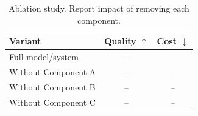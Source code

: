 \begin{table}[t]
  \centering
  \caption{Ablation study. Report impact of removing each component.}
  \label{tab:ablation}
  \begin{tabular}{lcc}
    \toprule
    Variant & Quality $\uparrow$ & Cost $\downarrow$ \\
    \midrule
    Full model/system & -- & -- \\
    Without Component A & -- & -- \\
    Without Component B & -- & -- \\
    Without Component C & -- & -- \\
    \bottomrule
  \end{tabular}
\end{table}
